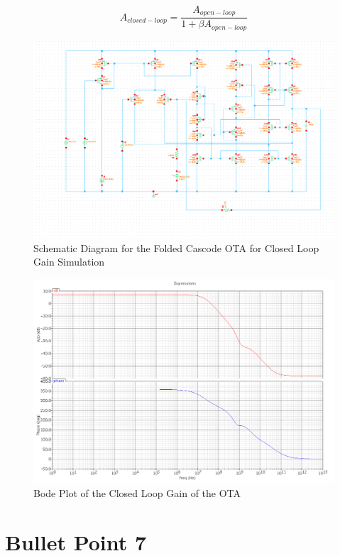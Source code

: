 \documentclass{article}
\begin{document}
\begin{equation}
A_{closed-loop} = \frac{A_{open-loop}}{1+\beta A_{open-loop}}
\end{equation}

\begin{figure}[H]
\centering
\includegraphics[width=7in]{bullet6_schem.png}
\caption{Schematic Diagram for the Folded Cascode OTA for Closed Loop Gain Simulation}
\label{b6_schem}
\end{figure}

\begin{figure}[H]
\centering
\includegraphics[width=7in]{bullet6_bode.png}
\caption{Bode Plot of the Closed Loop Gain of the OTA}
\label{b6_bode}
\end{figure}

\section{Bullet Point 7}
\end{document}
